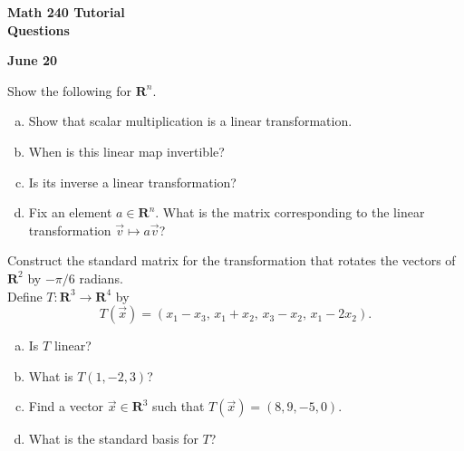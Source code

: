 \documentclass[a4paper,11pt]{article}
\newcommand{\R}{\mathbf{R}}
\begin{document}
\begin{center}
  {\Large\bfseries Math 240 Tutorial \\ Questions}
\end{center}
\begin{center}
  {\bfseries June 20}
\end{center}

 Show the following for $\R^n$.
\begin{enumerate}[(a)]
\item Show that scalar multiplication is a linear transformation.
\item When is this linear map invertible?
\item Is its inverse a linear transformation?
\item Fix an element $a \in \R^n$. What is the matrix corresponding to the
  linear transformation $\vec v \mapsto a\vec v$? \\
\end{enumerate}

 Construct the standard matrix for the
transformation that rotates the vectors of $\R^2$ by $-\pi/6$ radians. \\

 Define $T : \R^3 \rightarrow \R^4$ by
\[
  T(\vec x) = (x_1-x_3,\, x_1+x_2,\,x_3-x_2,\,x_1-2x_2).
\]
\begin{enumerate}[(a)]
\item Is $T$ linear?
\item What is $T(1,-2,3)$?
\item Find a vector $\vec x \in \R^3$ such that $T(\vec x)=(8,9,-5,0)$.
\item What is the standard basis for $T$? \\
\end{enumerate}
\end{document}
